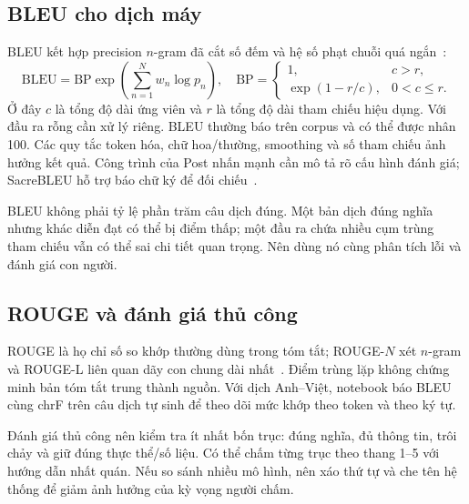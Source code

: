 \documentclass[11pt,a4paper]{article}
\numberwithin{equation}{section}
\begin{document}
\subsection{BLEU cho dịch máy}
BLEU kết hợp precision $n$-gram đã cắt số đếm và hệ số phạt chuỗi quá ngắn~\cite{bleu}:
\begin{equation}
\mathrm{BLEU}=\mathrm{BP}\exp\left(\sum_{n=1}^{N}w_n\log p_n\right),
\quad
\mathrm{BP}=\begin{cases}1,&c>r,\\\exp(1-r/c),&0<c\leq r.\end{cases}
\end{equation}
Ở đây $c$ là tổng độ dài ứng viên và $r$ là tổng độ dài tham chiếu hiệu dụng. Với đầu ra rỗng cần xử lý riêng. BLEU thường báo trên corpus và có thể được nhân 100. Các quy tắc token hóa, chữ hoa/thường, smoothing và số tham chiếu ảnh hưởng kết quả. Công trình của Post nhấn mạnh cần mô tả rõ cấu hình đánh giá; SacreBLEU hỗ trợ báo chữ ký để đối chiếu~\cite{sacrebleu}.

BLEU không phải tỷ lệ phần trăm câu dịch đúng. Một bản dịch đúng nghĩa nhưng khác diễn đạt có thể bị điểm thấp; một đầu ra chứa nhiều cụm trùng tham chiếu vẫn có thể sai chi tiết quan trọng. Nên dùng nó cùng phân tích lỗi và đánh giá con người.

\subsection{ROUGE và đánh giá thủ công}
ROUGE là họ chỉ số so khớp thường dùng trong tóm tắt; ROUGE-$N$ xét $n$-gram và ROUGE-L liên quan dãy con chung dài nhất~\cite{rouge}. Điểm trùng lặp không chứng minh bản tóm tắt trung thành nguồn. Với dịch Anh--Việt, notebook báo BLEU cùng chrF trên câu dịch tự sinh để theo dõi mức khớp theo token và theo ký tự.

Đánh giá thủ công nên kiểm tra ít nhất bốn trục: đúng nghĩa, đủ thông tin, trôi chảy và giữ đúng thực thể/số liệu. Có thể chấm từng trục theo thang 1--5 với hướng dẫn nhất quán. Nếu so sánh nhiều mô hình, nên xáo thứ tự và che tên hệ thống để giảm ảnh hưởng của kỳ vọng người chấm.
\end{document}
